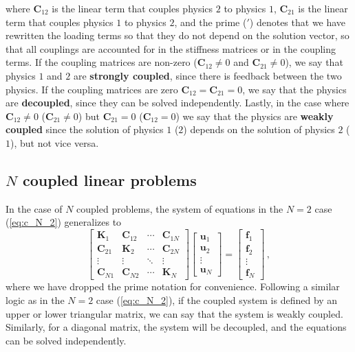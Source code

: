  where $\mathbf{C}_{12}$ is the linear term that couples physics $2$ to physics $1$,
$\mathbf{C}_{21}$ is the linear term that couples physics $1$ to physics $2$, and the
 prime ($\prime$) denotes that we have rewritten the loading terms so that they do not
 depend on the solution vector, so that all couplings are
 accounted for in the stiffness matrices or in the coupling terms. If the coupling
 matrices are non-zero ($\mathbf{C}_{12}\neq 0$ and $\mathbf{C}_{21}\neq 0$), we
 say that physics $1$ and $2$ are
    \textbf{strongly coupled}, since there is feedback between the two physics. If the
 coupling matrices are zero $\mathbf{C}_{12}=\mathbf{C}_{21}=0$, we say that the
 physics
 are \textbf{decoupled}, since they can be solved independently. Lastly, in the
 case where $\mathbf{C}_{12}\neq 0$ ($\mathbf{C}_{21}\neq 0$) but $\mathbf{C}_{21} = 0$ ($\mathbf{C}_{12} = 0$) we say that the
 physics are \textbf{weakly
 coupled} since the solution of physics $1$ ($2$) depends on the solution of physics
$2$ ($1$), but not vice versa.

\subsection*{$N$ coupled linear problems}

 In the case of $N$ coupled problems, the system of equations in the $N=2$ case (\eqref{eq:c_N_2}) generalizes to
    \begin{equation} \label{eq:multiphysics_strong}
        \begin{bmatrix}
 \mathbf{K}_1    & \mathbf{C}_{12} & \cdots & \mathbf{C}_{1N} \\
 \mathbf{C}_{21} & \mathbf{K}_2    & \cdots & \mathbf{C}_{2N} \\
            \vdots          & \vdots          & \ddots & \vdots          \\
 \mathbf{C}_{N1} & \mathbf{C}_{N2} & \cdots & \mathbf{K}_N
        \end{bmatrix}
        \begin{bmatrix}
 \mathbf{u}_1 \\
 \mathbf{u}_2 \\
            \vdots       \\
 \mathbf{u}_N
        \end{bmatrix}
 =
        \begin{bmatrix}
 \mathbf{f}_1 \\
 \mathbf{f}_2 \\
            \vdots       \\
 \mathbf{f}_N
        \end{bmatrix}\,,
    \end{equation}
 where we have dropped the prime notation for convenience. Following a similar logic as in the $N=2$ case (\eqref{eq:c_N_2}), if
 the coupled
 system is defined by an upper or lower triangular matrix, we can say that the
 system is weakly coupled. 
 Similarly, for a diagonal matrix, the system will be decoupled, and the equations can be
 solved independently.

